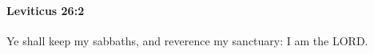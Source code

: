 
		\paragraph{Leviticus 26:2} %
			\label{LEVITICUS-26-2}

			Ye shall keep my sabbaths, and reverence my sanctuary: I am the LORD.


